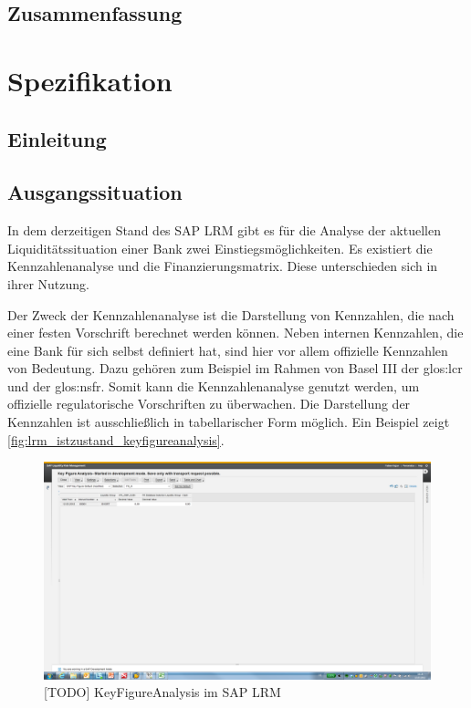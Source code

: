 
\section{Zusammenfassung}

\chapter{Spezifikation}
\section{Einleitung}

\section{Ausgangssituation}

In dem derzeitigen Stand des SAP LRM gibt es für die Analyse der aktuellen Liquiditätssituation einer Bank zwei Einstiegsmöglichkeiten. Es existiert die Kennzahlenanalyse und die Finanzierungsmatrix. Diese unterschieden sich in ihrer Nutzung.

Der Zweck der Kennzahlenanalyse ist die Darstellung von Kennzahlen, die nach einer festen Vorschrift berechnet werden können. Neben internen Kennzahlen, die eine Bank für sich selbst definiert hat, sind hier vor allem offizielle Kennzahlen von Bedeutung. Dazu gehören zum Beispiel im Rahmen von Basel III der \gls{glos:lcr} und der \gls{glos:nsfr}. Somit kann die Kennzahlenanalyse genutzt werden, um offizielle regulatorische Vorschriften zu überwachen. Die Darstellung der Kennzahlen ist ausschließlich in tabellarischer Form möglich. Ein Beispiel zeigt \vref{fig:lrm_istzustand_keyfigureanalysis}.

\begin{figure}[h]
\centering
\setlength{\unitlength}{1mm}
\includegraphics[width=15cm]{images/KeyFigureAnalysis_Example.png}
\caption{[TODO] KeyFigureAnalysis im SAP LRM\label{fig:lrm_istzustand_keyfigureanalysis}}
\end{figure}

